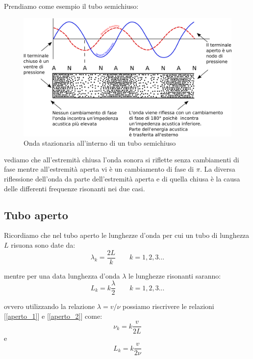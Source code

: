 \documentclass[a4paper,10pt,oneside]{article}
\begin{document}
Prendiamo come esempio il tubo semichiuso:
\begin{figure}[H]
 \centering
 \includegraphics[width=1.1\textwidth]{../Immagini/tubo_semichiuso.png}
 \caption{Onda stazionaria all'interno di un tubo semichiuso}
 \label{fig:tubo_semichiuso}
\end{figure}
vediamo che all'estremità chiusa l'onda sonora si riflette senza cambiamenti di fase mentre all'estremità aperta vi è un cambiamento di fase di $\pi$. La diversa riflessione dell'onda da parte dell'estremità aperta e di quella chiusa è la causa delle differenti frequenze risonanti nei due casi.

\subsection*{Tubo aperto}
Ricordiamo che nel tubo aperto le lunghezze d'onda per cui un tubo  di lunghezza $L$ risuona sono date da:
\begin{equation}\label{aperto_1}
 \lambda_k=\frac{2L}{k}\qquad k=1,2,3...
\end{equation}

mentre per una data lunghezza d'onda $\lambda$ le lunghezze risonanti saranno:
\begin{equation}\label{aperto_2}
 L_k=k\frac{\lambda}{2}\qquad k=1,2,3... 
\end{equation}

ovvero utilizzando la relazione $\lambda=v/\nu$ possiamo riscrivere le relazioni [\ref{aperto_1}] e [\ref{aperto_2}] come:
\begin{equation}
 \nu_k=k\frac{v}{2L}
\end{equation}
e
\begin{equation}
 L_k=k\frac{v}{2\nu}
\end{equation}
\end{document}

